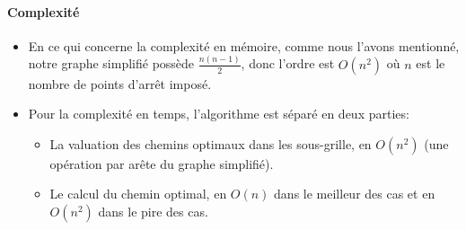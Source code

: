 \paragraph{Complexité}
\label{complexite}
\begin{itemize}
	\item En ce qui concerne la complexité en mémoire, comme nous l'avons mentionné, notre graphe simplifié possède $\frac{n(n-1)}{2}$, donc l'ordre est $O(n^2)$ où $n$ est le nombre de points d'arrêt imposé.\\
	\item Pour la complexité en temps, l'algorithme est séparé en deux parties:
	\begin{itemize}
			\item La valuation des chemins optimaux dans les sous-grille, en $O(n^2)$ (une opération par arête du graphe simplifié).
			\item Le calcul du chemin optimal, en $O(n)$ dans le meilleur des cas et en $O(n^2)$ dans le pire des cas.
	\end{itemize}
\end{itemize}
